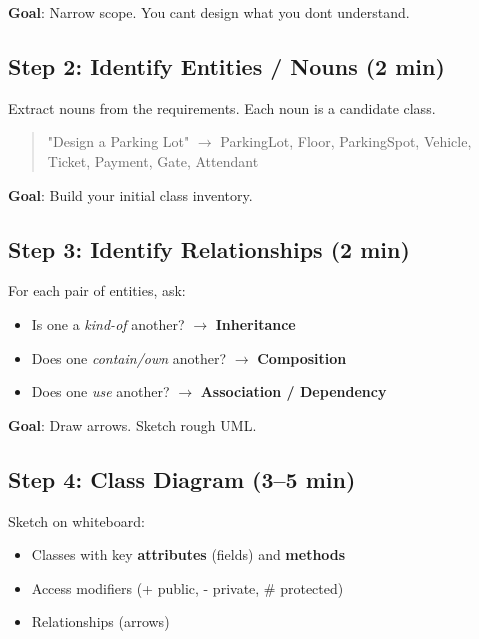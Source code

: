 \documentclass[11pt]{article}
\providecommand{\tightlist}{\setlength{\itemsep}{1pt}\setlength{\parskip}{0pt}}
\begin{document}
\textbf{Goal}: Narrow scope. You can\textquotesingle t design what you don\textquotesingle t understand.

\subsection{Step 2: Identify Entities / Nouns (2 min)}\label{step-2-identify-entities--nouns-2-min}

Extract nouns from the requirements. Each noun is a candidate class.

\begin{quote}
"Design a Parking Lot" \(\rightarrow\) ParkingLot, Floor, ParkingSpot, Vehicle, Ticket, Payment, Gate, Attendant
\end{quote}

\textbf{Goal}: Build your initial class inventory.

\subsection{Step 3: Identify Relationships (2 min)}\label{step-3-identify-relationships-2-min}

For each pair of entities, ask:

\begin{itemize}
\tightlist
\item
  Is one a \emph{kind-of} another? \(\rightarrow\) \textbf{Inheritance}
\item
  Does one \emph{contain/own} another? \(\rightarrow\) \textbf{Composition}
\item
  Does one \emph{use} another? \(\rightarrow\) \textbf{Association / Dependency}
\end{itemize}

\textbf{Goal}: Draw arrows. Sketch rough UML.

\subsection{Step 4: Class Diagram (3--5 min)}\label{step-4-class-diagram-35-min}

Sketch on whiteboard:

\begin{itemize}
\tightlist
\item
  Classes with key \textbf{attributes} (fields) and \textbf{methods}
\item
  Access modifiers (+ public, - private, \# protected)
\item
  Relationships (arrows)
\end{itemize}
\end{document}
